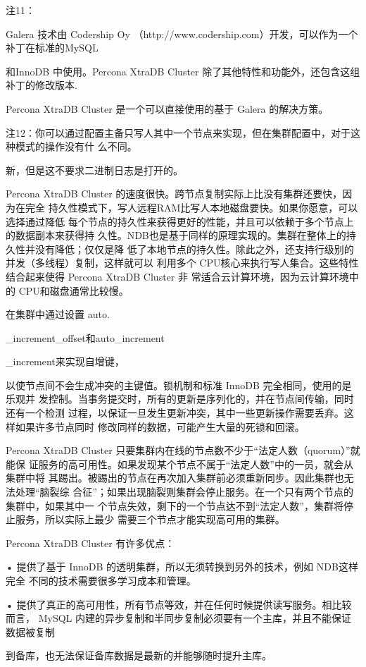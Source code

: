 注11：

Galera 技术由 Codership Oy （http://www.codership.com）开发，可以作为一个补丁在标准的MySQL

和InnoDB 中使用。Percona XtraDB Cluster 除了其他特性和功能外，还包含这组补丁的修改版本.

Percona XtraDB Cluster 是一个可以直接使用的基于 Galera 的解决方策。

注12：你可以通过配置主备只写人其中一个节点来实现，但在集群配置中，对于这种模式的操作没有什
么不同。

新，但是这不要求二进制日志是打开的。

Percona XtraDB Cluster 的速度很快。跨节点复制实际上比没有集群还要快，因为在完全
持久性模式下，写人远程RAM比写人本地磁盘要快。如果你愿意，可以选择通过降低
每个节点的持久性来获得更好的性能，并且可以依赖于多个节点上的数据副本来获得持
久性。NDB也是基于同样的原理实现的。集群在整体上的持久性并没有降低；仅仅是降
低了本地节点的持久性。除此之外，还支持行级别的并发（多线程）复制，这样就可以
利用多个 CPU核心来执行写人集合。这些特性结合起来使得 Percona XtraDB Cluster 非
常适合云计算环境，因为云计算环境中的 CPU和磁盘通常比较慢。

在集群中通过设置 auto.

\_increment\_offset和auto\_increment

\_increment来实现自增键，

以使节点间不会生成冲突的主键值。锁机制和标准 InnoDB 完全相同，使用的是乐观并
发控制。当事务提交时，所有的更新是序列化的，并在节点间传输，同时还有一个检测
过程，以保证一旦发生更新冲突，其中一些更新操作需要丢弃。这样如果许多节点同时
修改同样的数据，可能产生大量的死锁和回滚。

Percona XtraDB Cluster 只要集群内在线的节点数不少于“法定人数（quorum）”就能保
证服务的高可用性。如果发现某个节点不属于“法定人数”中的一员，就会从集群中将
其踢出。被踢出的节点在再次加入集群前必须重新同步。因此集群也无法处理“脑裂综
合征”；如果出现脑裂则集群会停止服务。在一个只有两个节点的集群中，如果其中一
个节点失效，剩下的一个节点达不到“法定人数”，集群将停止服务，所以实际上最少
需要三个节点才能实现高可用的集群。

Percona XtraDB Cluster 有许多优点：

• 提供了基于 InnoDB 的透明集群，所以无须转换到另外的技术，例如 NDB这样完全
不同的技术需要很多学习成本和管理。

• 提供了真正的高可用性，所有节点等效，并在任何时候提供读写服务。相比较而言，
MySQL 内建的异步复制和半同步复制必须要有一个主库，并且不能保证数据被复制

到备库，也无法保证备库数据是最新的并能够随时提升主库。

